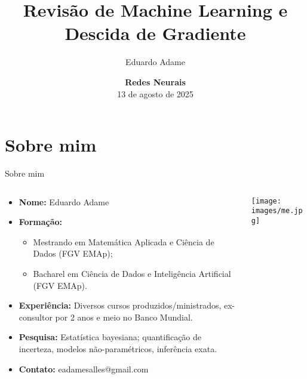 \documentclass[xcolor=dvipsnames,t,aspectratio=169]{beamer} %
\title{Revisão de Machine Learning e Descida de Gradiente}
\author{
    Eduardo Adame
}
\date{{\color{nes_dark_purple}  \textbf{Redes Neurais}\\[0.5em] 13 de agosto de 2025 }}
\begin{document}
\frame[plain]{\titlepage}
\setcounter{framenumber}{0}


\section{Sobre mim}
\begin{frame}[c]{Sobre mim}
    \begin{columns}[c]
        \begin{column}{0.7\textwidth}
            \begin{itemize}
                \item \textbf{Nome:} Eduardo Adame
                \item \textbf{Formação:}
                \begin{itemize}
                    \item Mestrando em Matemática Aplicada e Ciência de Dados (FGV EMAp); 
                    \item Bacharel em Ciência de Dados e Inteligência Artificial (FGV EMAp).
                \end{itemize}
                \item \textbf{Experiência:} Diversos cursos produzidos/ministrados, ex-consultor por 2 anos e meio no Banco Mundial.
                \item \textbf{Pesquisa:} Estatística bayesiana; quantificação de incerteza, modelos não-paramétricos, inferência exata.
                \item \textbf{Contato:} eadamesalles@gmail.com
            \end{itemize}
        \end{column}
        \begin{column}{0.3\textwidth}
            \centering
            \texttt{[image: images/me.jpg]}
        \end{column}
    \end{columns}
\end{frame}
\end{document}
